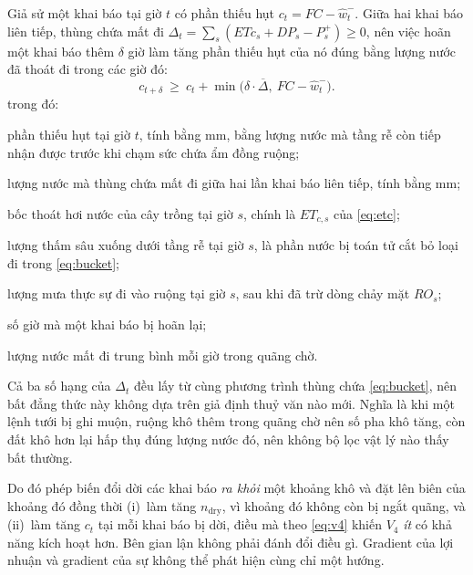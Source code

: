 \begin{proposition}
\label{prop:coincide}
Giả sử một khai báo tại giờ $t$ có phần thiếu hụt $c_t=FC-\hat w_t^{-}$. Giữa hai khai báo liên tiếp, thùng chứa mất đi
$\Delta_t=\sum_{s}(\mathit{ETc}_s+\mathit{DP}_s-P_s^{+})\ge 0$, nên việc hoãn
một khai báo thêm $\delta$ giờ làm tăng phần thiếu hụt của nó đúng bằng lượng
nước đã thoát đi trong các giờ đó:
\begin{equation}
c_{t+\delta}\ \ge\ c_t+\min\!\bigl(\delta\cdot\overline{\Delta},\ FC-\hat w_t^{-}\bigr).
\label{eq:delay}
\end{equation}
trong đó:
\begin{symbolist}
\item[$c_t$] phần thiếu hụt tại giờ $t$, tính bằng mm, bằng lượng nước mà tầng rễ
  còn tiếp nhận được trước khi chạm sức chứa ẩm đồng ruộng;
\item[$\Delta_t$] lượng nước mà thùng chứa mất đi giữa hai lần khai báo liên tiếp,
  tính bằng mm;
\item[$\mathit{ETc}_s$] bốc thoát hơi nước của cây trồng tại giờ $s$, chính là
  $ET_{c,s}$ của \eqref{eq:etc};
\item[$\mathit{DP}_s$] lượng thấm sâu xuống dưới tầng rễ tại giờ $s$, là phần
  nước bị toán tử cắt bỏ loại đi trong \eqref{eq:bucket};
\item[$P_s^{+}$] lượng mưa thực sự đi vào ruộng tại giờ $s$, sau khi đã trừ dòng
  chảy mặt $RO_s$;
\item[$\delta$] số giờ mà một khai báo bị hoãn lại;
\item[$\overline{\Delta}$] lượng nước mất đi trung bình mỗi giờ trong quãng chờ.
\end{symbolist}

Cả ba số hạng của $\Delta_t$ đều lấy từ cùng phương trình thùng chứa
\eqref{eq:bucket}, nên bất đẳng thức này không dựa trên giả định thuỷ văn nào mới.
Nghĩa là khi một lệnh tưới bị ghi muộn, ruộng khô thêm trong quãng chờ nên số pha
khô tăng, còn đất khô hơn lại hấp thụ đúng lượng nước đó, nên không bộ lọc vật lý
nào thấy bất thường.

Do đó phép biến đổi dời các khai báo \emph{ra khỏi} một khoảng khô và đặt lên
biên của khoảng đó đồng thời (i)~làm tăng $n_{\mathrm{dry}}$, vì khoảng đó
không còn bị ngắt quãng, và (ii)~làm tăng $c_t$ tại mỗi khai báo bị dời, điều
mà theo \eqref{eq:v4} khiến $V_4$ \emph{ít} có khả năng kích hoạt hơn. Bên gian lận không phải đánh đổi điều gì. Gradient của lợi nhuận và gradient của sự
không thể phát hiện cùng chỉ một hướng.
\end{proposition}

